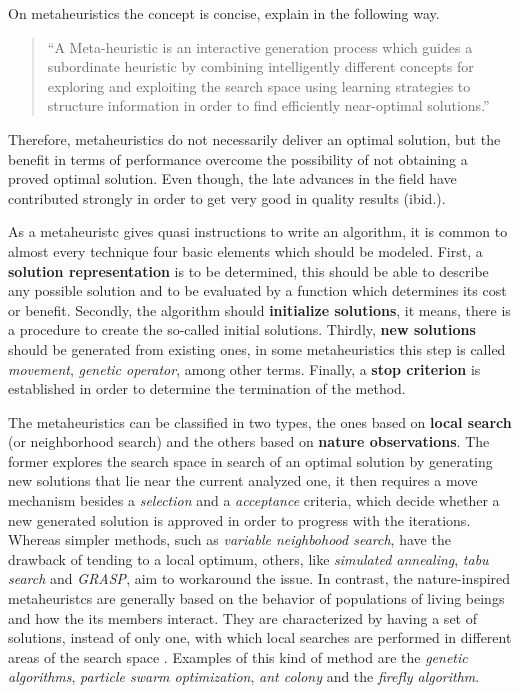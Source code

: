 \documentclass[tuberlin,cic,tc,openright,english,noabntcite,oneside]{iiufrgs}
\begin{document}
On metaheuristics the concept is concise, \textcite[p. 3]{osman_meta-heuristics_2012} explain in the following way.
\begin{quote}
\enquote{A Meta-heuristic is an interactive generation process which guides a subordinate heuristic by combining intelligently different concepts for exploring and exploiting the search space using learning strategies to structure information in order to find efficiently near-optimal solutions.}
\end{quote}

Therefore, metaheuristics do not necessarily deliver an optimal solution, but the benefit in terms of performance overcome the possibility of not obtaining a proved optimal solution. Even though, the late advances in the field have contributed strongly in order to get very good in quality results (ibid.).

As a metaheuristc gives quasi instructions to write an algorithm, it is common to almost every technique four basic elements which should be modeled. First, a \textbf{solution representation} is to be determined, this should be able to describe any possible solution and to be evaluated by a function which determines its cost or benefit. Secondly, the algorithm should \textbf{initialize solutions}, it means, there is a procedure to create the so-called initial solutions. Thirdly, \textbf{new solutions} should be generated from existing ones, in some metaheuristics this step is called \emph{movement}, \emph{genetic operator}, among other terms. Finally, a \textbf{stop criterion} is established in order to determine the termination of the method.

The metaheuristics can be classified in two types, the ones based on \textbf{local search} (or neighborhood search) and the others based on \textbf{nature observations}. The former explores the search space in search of an optimal solution by generating new solutions that lie near the current analyzed one, it then requires a move mechanism besides a \emph{selection} and a \emph{acceptance} criteria, which decide whether a new generated solution is approved in order to progress with the iterations. Whereas simpler methods, such as \emph{variable neighbohood search}, have the drawback of tending to a local optimum, others, like \emph{simulated annealing}, \emph{tabu search} and \emph{GRASP}, aim to workaround the issue. In contrast, the nature-inspired metaheuristcs are generally based on the behavior of populations of living beings and how the its members interact. They are characterized by having a set of solutions, instead of only one, with which local searches are performed in different areas of the search space \parencite[p. 7]{osman_meta-heuristics_2012}. Examples of this kind of method are the \emph{genetic algorithms}, \emph{particle swarm optimization}, \emph{ant colony} and the \emph{firefly algorithm}.
\end{document}
